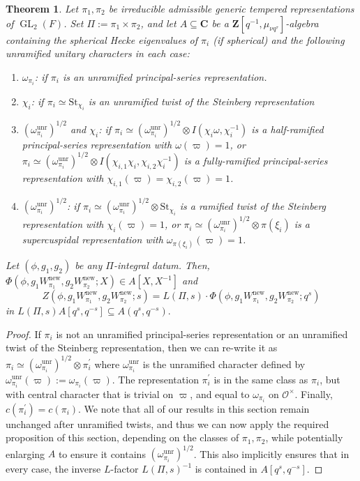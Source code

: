 \documentclass[10pt,a4paper]{amsart}
\newtheorem{thm}{Theorem}
\DeclareMathOperator{\GL}{GL}
\begin{document}
\begin{thm}\label{thm: main theorem}
    Let $\pi_1,\pi_2$ be irreducible admissible generic tempered representations of $\GL_2(F)$. Set $\Pi:=\pi_1\times\pi_2$, and let $A\subseteq\mathbf{C}$ be a $\mathbf{Z}[q^{-1},\mu_{\nu q^\tau}]$-algebra containing the spherical Hecke eigenvalues of $\pi_i$ \emph{(}if spherical\emph{)} and the following unramified unitary characters in each case: 
    \begin{enumerate}
        \item $\omega_{\pi_i}$\emph{:} if $\pi_i$ is an unramified principal-series representation.
        \item $\chi_i$\emph{:} if $\pi_i\simeq\mathrm{St}_{\chi_i}$ is an unramified twist of the Steinberg representation
        \item $(\omega_{\pi_i}^\mathrm{unr})^{1/2}$ and $\chi_i$\emph{:} if $\pi_i\simeq (\omega_{\pi_i}^\mathrm{unr})^{1/2}\otimes I(\chi_i\omega,\chi_i^{-1})$ is a half-ramified principal-series representation with $\omega(\varpi)=1$, or $\pi_i\simeq (\omega_{\pi_i}^\mathrm{unr})^{1/2}\otimes I(\chi_{i,1}\chi_i,\chi_{i,2}\chi_i^{-1})$ is a fully-ramified principal-series representation with $\chi_{i,1}(\varpi)=\chi_{i,2}(\varpi)=1$.
        \item $(\omega_{\pi_i}^\mathrm{unr})^{1/2}$\emph{:} if $\pi_i\simeq (\omega_{\pi_i}^\mathrm{unr})^{1/2}\otimes \mathrm{St}_{\chi_i}$ is a ramified twist of the Steinberg representation with $\chi_i(\varpi)=1$, or $\pi_i\simeq (\omega_{\pi_i}^\mathrm{unr})^{1/2}\otimes \pi(\xi_i)$ is a supercuspidal representation with $\omega_{\pi(\xi_i)}(\varpi)=1$.
    \end{enumerate}
    Let $(\phi,g_1,g_2)$ be any $\Pi$-integral datum. Then,  $\Phi(\phi,g_1W_{\pi_1}^\mathrm{new},g_2W_{\pi_2}^\mathrm{new};X)\in A[X,X^{-1}]$ and
    $$Z(\phi,g_1W_{\pi_1}^\mathrm{new},g_2W_{\pi_2}^\mathrm{new};s)=L(\Pi,s)\cdot \Phi(\phi,g_1W_{\pi_1}^\mathrm{new},g_2W_{\pi_2}^\mathrm{new};q^s)$$
    in $L(\Pi,s)A[q^s,q^{-s}]\subseteq A(q^s,q^{-s}).$
\end{thm}

\begin{proof}
    If $\pi_i$ is not an unramified principal-series representation or an unramified twist of the Steinberg representation, then we can re-write it as  $\pi_i\simeq (\omega_{\pi_i}^\mathrm{unr})^{1/2}\otimes \pi_i^{'}$ where $\omega_{\pi_i}^\mathrm{unr}$ is the unramified character defined by $\omega_{\pi_i}^\mathrm{unr}(\varpi):=\omega_{\pi_i}(\varpi)$. The representation $\pi_i^{'}$ is in the same class as $\pi_i$, but with central character that is trivial on $\varpi$, and equal to $\omega_{\pi_i}$ on $\mathcal{O}^\times$. Finally, $c(\pi_i^{'})=c(\pi_i)$. We note that all of our results in this section remain unchanged after unramified twists, and thus we can now apply the required proposition of this section, depending on the classes of $\pi_1,\pi_2$, while potentially enlarging $A$ to ensure it contains $(\omega_{\pi_i}^\mathrm{unr})^{1/2}$. This also implicitly ensures that in every case, the inverse $L$-factor $L(\Pi,s)^{-1}$ is contained in $A[q^s,q^{-s}]$.
\end{proof}
\end{document}
